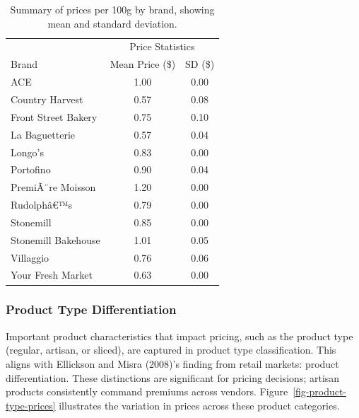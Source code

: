 \documentclass[
  letterpaper,
  DIV=11,
  numbers=noendperiod]{scrartcl}
\begin{document}
\begin{longtable}[t]{lcc}

\caption{\label{tbl-brand-summary}Summary of prices per 100g by brand,
showing mean and standard deviation.}

\tabularnewline

\toprule
\multicolumn{1}{c}{ } & \multicolumn{2}{c}{Price Statistics} \\
\cmidrule(l{3pt}r{3pt}){2-3}
Brand & Mean Price (\$) & SD (\$)\\
\midrule
ACE & 1.00 & 0.00\\
Country Harvest & 0.57 & 0.08\\
Front Street Bakery & 0.75 & 0.10\\
La Baguetterie & 0.57 & 0.04\\
Longo's & 0.83 & 0.00\\
\addlinespace
Portofino & 0.90 & 0.04\\
PremiÃ¨re Moisson & 1.20 & 0.00\\
Rudolphâ€™s & 0.79 & 0.00\\
Stonemill & 0.85 & 0.00\\
Stonemill Bakehouse & 1.01 & 0.05\\
\addlinespace
Villaggio & 0.76 & 0.06\\
Your Fresh Market & 0.63 & 0.00\\
\bottomrule

\end{longtable}

\subsubsection{Product Type
Differentiation}\label{product-type-differentiation}

Important product characteristics that impact pricing, such as the
product type (regular, artisan, or sliced), are captured in product type
classification. This aligns with Ellickson and Misra (2008)'s finding
from retail markets: product differentiation. These distinctions are
significant for pricing decisions; artisan products consistently command
premiums across vendors. Figure~\ref{fig-product-type-prices}
illustrates the variation in prices across these product categories.
\end{document}
